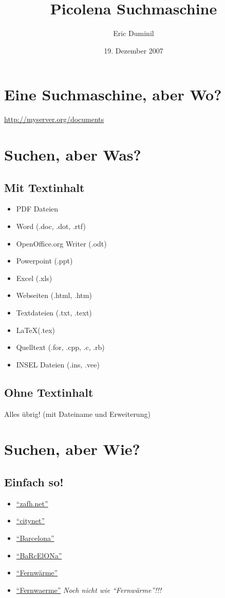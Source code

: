 \documentclass[a4paper,10pt]{article}
\title{Picolena Suchmaschine}
\author{Eric Duminil}
\date{19. Dezember 2007}
\newcommand{\link}{http://myserver.org/documents}
\newcommand{\searchlink}[1]{\href{\link/#1}{``#1''}}
\begin{document}
\maketitle

\section{Eine Suchmaschine, aber Wo?}
\url{\link}

\section{Suchen, aber Was?}

\subsection{Mit Textinhalt}
\begin{itemize}
	\item PDF Dateien
	\item Word (.doc, .dot, .rtf)
	\item OpenOffice.org Writer (.odt)
	\item Powerpoint (.ppt)
	\item Excel (.xls)
	\item Webseiten (.html, .htm)
	\item Textdateien (.txt, .text)
	\item \LaTeX (.tex)
	\item Quelltext (.for, .cpp, .c, .rb)
	\item INSEL Dateien (.ins, .vee)
\end{itemize}

\subsection{Ohne Textinhalt}
Alles übrig! (mit Dateiname und Erweiterung)


\section{Suchen, aber Wie?}

\subsection{Einfach so!}

\begin{itemize}
	\item \searchlink{zafh.net}
	\item \searchlink{citynet}
	\item \searchlink{Barcelona}
	\item \searchlink{BaRcElONa}
	\item \href{\link/Fernw\%C3\%A4rme}{``Fernwärme''}
        \item \searchlink{Fernwaerme} \textit{Noch nicht wie ``Fernwärme''!!!}
\end{itemize}
\end{document}
